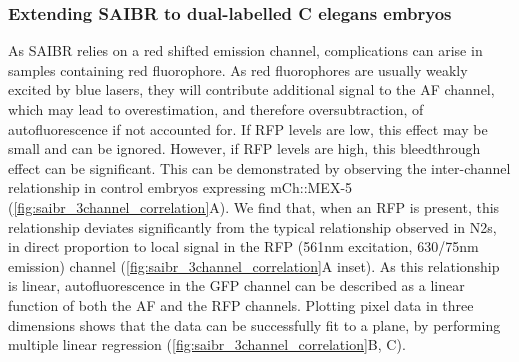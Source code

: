 \documentclass[12pt]{"article"}
\begin{document}
\subsubsection{Extending SAIBR to dual-labelled C elegans embryos}

As SAIBR relies on a red shifted emission channel, complications can arise in samples containing red fluorophore. As red fluorophores are usually weakly excited by blue lasers, they will contribute additional signal to the AF channel, which may lead to overestimation, and therefore oversubtraction, of autofluorescence if not accounted for. If RFP levels are low, this effect may be small and can be ignored. However, if RFP levels are high, this bleedthrough effect can be significant. This can be demonstrated by observing the inter-channel relationship in control embryos expressing mCh::MEX-5 (\cref{fig:saibr_3channel_correlation}A). We find that, when an RFP is present, this relationship deviates significantly from the typical relationship observed in N2s, in direct proportion to local signal in the RFP (561nm excitation, 630/75nm emission) channel (\cref{fig:saibr_3channel_correlation}A inset). As this relationship is linear, autofluorescence in the GFP channel can be described as a linear function of both the AF and the RFP channels. Plotting pixel data in three dimensions shows that the data can be successfully fit to a plane, by performing multiple linear regression (\cref{fig:saibr_3channel_correlation}B, C). \\
\end{document}
